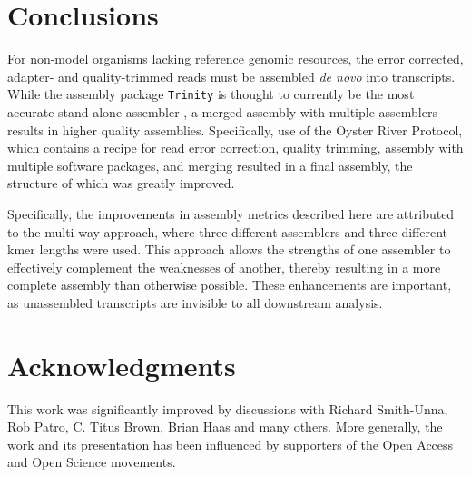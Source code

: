 \documentclass[10pt,letterpaper]{article}
\begin{document}
\section{Conclusions}

For non-model organisms lacking reference genomic resources, the error corrected, adapter- and quality-trimmed reads must be assembled \textit{de novo} into transcripts. While the assembly package \texttt{Trinity} \citep{Haas:2013jq} is thought to currently be the most accurate stand-alone assembler \citep{Li:2014cm}, a merged assembly with multiple assemblers results in higher quality assemblies. Specifically, use of the Oyster River Protocol, which contains a recipe for read error correction, quality trimming, assembly with multiple software packages, and merging resulted in a final assembly, the structure of which was greatly improved. 

Specifically, the improvements in assembly metrics described here are attributed to the multi-way approach, where three different assemblers and three different kmer lengths were used. This approach allows the strengths of one assembler to effectively complement the weaknesses of another, thereby resulting in a more complete assembly than otherwise possible. These enhancements are important, as unassembled transcripts are invisible to all downstream analysis.      

\section*{Acknowledgments}

This work was significantly improved by discussions with Richard Smith-Unna, Rob Patro, C. Titus Brown, Brian Haas and many others. More generally, the work and its presentation has been influenced by supporters of the Open Access and Open Science movements. 


\end{document}
